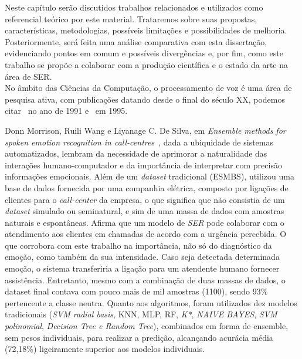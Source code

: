
Neste capítulo serão discutidos trabalhos relacionados e utilizados como referencial teórico por este material. Trataremos sobre suas propostas, características, metodologias, possíveis limitações e possibilidades de melhoria. Posteriormente, será feita uma análise comparativa com esta dissertação, evidenciando pontos em comum e possíveis divergências e, por fim, como este trabalho se propõe a colaborar com a produção científica e o estado da arte na área de \acrshort{SER}.\\


No âmbito das Ciências da Computação, o processamento de voz é uma área de pesquisa ativa, com publicações datando desde o final do século XX, podemos citar~\cite{12.27} no ano de 1991 e~\cite{12.28} em 1995.


Donn Morrison, Ruili Wang e Liyanage C. De Silva, em \textit{Ensemble methods for spoken emotion recognition in call-centres}~\cite{32.32}, dada a ubiquidade de sistemas automatizados, lembram da necessidade de aprimorar a naturalidade das interações humano-computador e da importância de interpretar com precisão informações emocionais. Além de um \textit{dataset} tradicional (ESMBS), utilizou uma base de dados fornecida por uma companhia elétrica, composto por ligações de clientes para o \textit{call-center} da empresa, o que significa que não consistia de um \textit{dataset} simulado ou seminatural, e sim de uma massa de dados com amostras naturais e espontâneas. Afirma que um modelo de \textit{SER} pode colaborar com o atendimento aos clientes em chamadas de acordo com a urgência percebida. O que corrobora com este trabalho na importância, não só do diagnóstico da emoção, como também da sua intensidade. Caso seja detectada determinada emoção, o sistema transferiria a ligação para um atendente humano fornecer assistência. Entretanto, mesmo com a combinação de duas massas de dados, o dataset final contava com pouco mais de mil amostras (1100), sendo 93\% pertencente a classe neutra. Quanto aos algoritmos, foram utilizados dez modelos tradicionais (\textit{SVM radial basis}, \acrshort{KNN}, \acrshort{MLP}, \acrshort{RF}, \textit{K*}, \textit{NAIVE BAYES}, \textit{SVM polinomial}, \textit{Decision Tree e Random Tree}), combinados em forma de ensemble, sem pesos individuais, para realizar a predição, alcançando acurácia média (72,18\%) ligeiramente superior aos modelos individuais.

